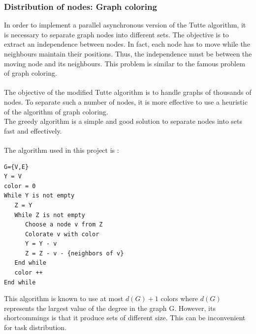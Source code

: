 \subsubsection{Distribution of nodes: Graph coloring}
In order to implement a parallel asynchronous version of the Tutte algorithm, it is necessary to separate graph nodes into different sets. The objective is to extract an independence between nodes. In fact, each node has to move while the neighbours maintain their positions. Thus, the independence must be between the moving node and its neighbours. This problem is similar to the famous problem of graph coloring.
\paragraph*{}
The objective of the modified Tutte algorithm is to handle graphs of thousands of nodes. To separate such a number of nodes, it is more effective to use a heuristic of the algorithm of graph coloring.\\
The greedy algorithm is a simple and good solution to separate nodes into sets fast and effectively.
\paragraph*{}
The algorithm used in this project is :
\begin{verbatim}
G={V,E}
Y = V
color = 0
While Y is not empty
   Z = Y
   While Z is not empty
      Choose a node v from Z
      Colorate v with color
      Y = Y - v
      Z = Z - v - {neighbors of v}
   End while
   color ++
End while
\end{verbatim}

This algorithm is known to use at most $d(G)+1$ colors where $d(G)$ represents the largest value of the degree in the graph G. However, its shortcommings is that it produce sets of different size. This can be inconvenient for task distribution.
